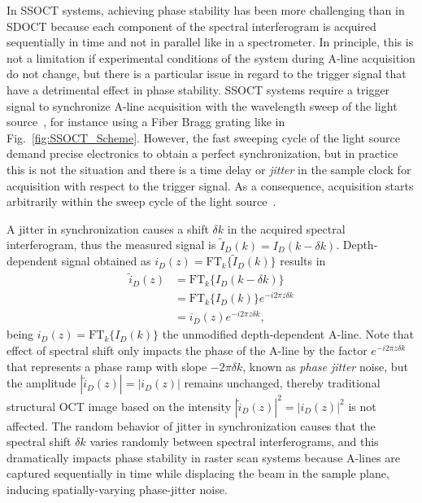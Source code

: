 In SSOCT systems, achieving phase stability has been more challenging than in SDOCT because each component of the spectral interferogram is acquired sequentially in time and not in parallel like in a spectrometer. In principle, this is not a limitation if experimental conditions of the system during A-line acquisition do not change, but there is a particular issue in regard to the trigger signal that have a detrimental effect in phase stability. SSOCT systems require a trigger signal to synchronize A-line acquisition with the wavelength sweep of the light source~\cite{Vakoc2005_Phaseresolved}, for instance using a Fiber Bragg grating like in Fig.~\ref{fig:SSOCT_Scheme}. However, the fast sweeping cycle of the light source demand precise electronics to obtain a perfect synchronization, but in practice this is not the situation and there is a time delay or \textit{jitter} in the sample clock for acquisition with respect to the trigger signal. As a consequence, acquisition starts arbitrarily within the sweep cycle of the light source~\cite{Vakoc2005_Phaseresolved}.

A jitter in synchronization causes a shift $\delta k$ in the acquired spectral interferogram, thus the measured signal is $\tilde{I}_D(k) = I_D(k-\delta k)$. Depth-dependent signal obtained as $i_D(z)= \text{FT}_k\{\tilde{I}_D(k)\}$ results in~\cite{Hong2012_Highpenetration}
\begin{align} \label{eq:phaseJitter}
    \tilde{i}_D(z) &= \text{FT}_k\{I_D(k-\delta k)\} \nonumber \\
    &=  \text{FT}_k\{I_D(k)\} e^{-i2\pi z\delta k} \nonumber \\
    &=  i_D(z) e^{-i2\pi z\delta k},
\end{align}
being $i_D(z)=\text{FT}_k\{I_D(k)\}$ the unmodified depth-dependent A-line. Note that effect of spectral shift only impacts the phase of the A-line by the factor $e^{-i2\pi z\delta k}$ that represents a phase ramp with slope $-2\pi\delta k$, known as \textit{phase jitter} noise, but the amplitude $|\tilde{i}_D(z)|=|i_D(z)|$ remains unchanged, thereby traditional structural OCT image based on the intensity $|\tilde{i}_D(z)|^2=|i_D(z)|^2$ is not affected. The random behavior of jitter in synchronization causes that the spectral shift $\delta k$ varies randomly between spectral interferograms, and this dramatically impacts phase stability in raster scan systems because A-lines are captured sequentially in time while displacing the beam in the sample plane, inducing spatially-varying phase-jitter noise.

